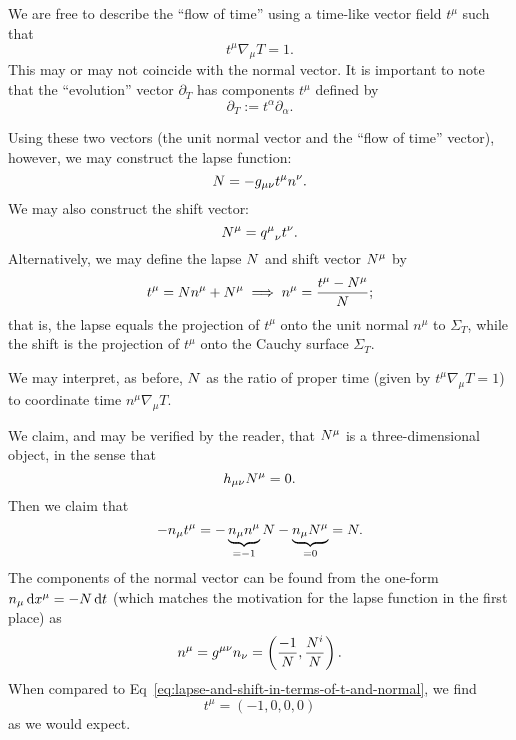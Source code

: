 We are free to describe the ``flow of time''
using a time-like vector field $t^{\mu}$ such that
\begin{equation}
t^{\mu}\nabla_{\mu}T=1.
\end{equation}
This may or may not coincide with the normal vector. It is important to
note that the ``evolution'' vector $\partial_{T}$ has components $t^{\mu}$ 
defined by
\begin{equation}
  \partial_{T} := t^{\alpha}\partial_{\alpha}.
\end{equation}

Using these two vectors (the unit normal vector and the ``flow of time''
vector), however, we may construct the lapse function:
\begin{equation}
N = -g_{\mu\nu}t^{\mu}n^{\nu}.
\end{equation}
We may also construct the shift vector:
\begin{equation}
N^{\mu}  = {q^{\mu}}_{\nu}t^{\nu}.
\end{equation}
Alternatively, we may define the lapse $N$ and shift vector
$N^{\mu}$ by
\begin{equation}\label{eq:lapse-and-shift-in-terms-of-t-and-normal}
t^{\mu} = N n^{\mu} + N^{\mu} \implies n^{\mu} = \frac{t^{\mu}-N^{\mu}}{N};
\end{equation}
that is, the lapse equals the projection of $t^{\mu}$ onto the unit
normal $n^{\mu}$ to $\Sigma_{T}$, while the shift is the projection of
$t^{\mu}$ onto the Cauchy surface $\Sigma_{T}$.

We may interpret, as before, $N$ as the ratio of proper time (given
by $t^{\mu}\nabla_{\mu} T=1$) to coordinate time $n^{\mu}\nabla_{\mu}T$.

We claim, and may be verified by the reader, that $N^{\mu}$ is a
three-dimensional object, in the sense that
\begin{equation}
h_{\mu\nu}N^{\mu} = 0.
\end{equation}
Then we claim that
\begin{equation}
-n_{\mu}t^{\mu} = -\underbrace{n_{\mu}n^{\mu}}_{=-1}N - \underbrace{n_{\mu}N^{\mu}}_{=0}
= N.
\end{equation}
The components of the normal vector can be found from the one-form
$n_{\mu}\,\mathrm{d} x^{\mu}=-N\,\mathrm{d} t$ (which matches the motivation for the
lapse function in the first place) as
\begin{equation}
n^{\mu} = g^{\mu\nu}n_{\nu} = \left(\frac{-1}{N},\frac{N^{i}}{N}\right).
\end{equation}
When compared to Eq~\eqref{eq:lapse-and-shift-in-terms-of-t-and-normal},
we find
\begin{equation}
t^{\mu} = (-1, 0, 0, 0)
\end{equation}
as we would expect.